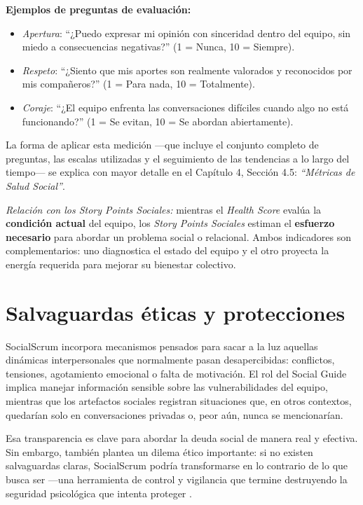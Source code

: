 \vspace{1em}

\textbf{Ejemplos de preguntas de evaluación:}
\begin{itemize}
    \item \textit{Apertura}: ``¿Puedo expresar mi opinión con sinceridad dentro del equipo, sin miedo a consecuencias negativas?'' (1 = Nunca, 10 = Siempre).
    \item \textit{Respeto}: ``¿Siento que mis aportes son realmente valorados y reconocidos por mis compañeros?'' (1 = Para nada, 10 = Totalmente).
    \item \textit{Coraje}: ``¿El equipo enfrenta las conversaciones difíciles cuando algo no está funcionando?'' (1 = Se evitan, 10 = Se abordan abiertamente).
\end{itemize}

La forma de aplicar esta medición —que incluye el conjunto completo de preguntas, las escalas utilizadas y el seguimiento de las tendencias a lo largo del tiempo— se explica con mayor detalle en el Capítulo 4, Sección 4.5: \textit{``Métricas de Salud Social''}.

\emph{Relación con los Story Points Sociales:} mientras el \textit{Health Score} evalúa la \textbf{condición actual} del equipo, los \textit{Story Points Sociales} estiman el \textbf{esfuerzo necesario} para abordar un problema social o relacional. Ambos indicadores son complementarios: uno diagnostica el estado del equipo y el otro proyecta la energía requerida para mejorar su bienestar colectivo.

\FloatBarrier

\section{Salvaguardas éticas y protecciones}

SocialScrum incorpora mecanismos pensados para sacar a la luz aquellas dinámicas interpersonales que normalmente pasan desapercibidas: conflictos, tensiones, agotamiento emocional o falta de motivación. El rol del Social Guide implica manejar información sensible sobre las vulnerabilidades del equipo, mientras que los artefactos sociales registran situaciones que, en otros contextos, quedarían solo en conversaciones privadas o, peor aún, nunca se mencionarían.

Esa transparencia es clave para abordar la deuda social de manera real y efectiva. Sin embargo, también plantea un dilema ético importante: si no existen salvaguardas claras, SocialScrum podría transformarse en lo contrario de lo que busca ser —una herramienta de control y vigilancia que termine destruyendo la seguridad psicológica que intenta proteger \cite{mayer_integrative_1995}.

